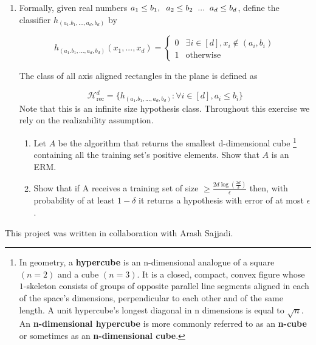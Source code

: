 \documentclass[]{book}
\theoremstyle{definition}
\begin{document}
\begin{enumerate}
    
    
    
    
    
    
    
    \item Formally, given real numbers $a_1 \leq b_1, \hspace{0.2 cm} a_2 \leq b_2 \hspace{0.2 cm} ... \hspace{0.2 cm} a_d \leq b_d $, define the classifier $h_{(a_1.b_1,...,a_d,b_d)}$ by

\begin{equation*}
  h_{(a_1.b_1,...,a_d,b_d)}(x_1,...,x_d)= \left\{\begin{matrix}
0 & \exists i \in [d] , x_i \notin (a_i,b_i)  \\ 
1 & \text{otherwise}
\end{matrix}\right. 
\end{equation*}

The class of all axis aligned rectangles in the plane is defined as

\begin{equation*}
    \mathcal{H}_{\text{rec}}^d=\{ h_{(a_1.b_1,...,a_d,b_d)}:\forall i \in [d],a_i \leq b_i\}
\end{equation*}
    Note that this is an infinite size hypothesis class. Throughout this exercise we rely
on the realizability assumption.
 
 \begin{enumerate}[I]
  \item Let $A$ be the algorithm that returns the smallest d-dimensional cube
  \footnote{In geometry, a \textbf{hypercube} is an n-dimensional analogue of a square $(n = 2)$ and a cube $(n = 3)$. It is a closed, compact, convex figure whose $1$-skeleton consists of groups of opposite parallel line segments aligned in each of the space's dimensions, perpendicular to each other and of the same length. A unit hypercube's longest diagonal in n dimensions is equal to ${ {\sqrt {n}}.}$
  An \textbf{n-dimensional hypercube} is more commonly referred to as an \textbf{n-cube} or sometimes as an \textbf{n-dimensional cube}.
  }
 containing all the training set's positive elements. Show that $A$ is an ERM.
  
  
  \item Show that if A receives a training set of size $\geq \frac{2d \log (\frac{2d}{\delta}) }{\epsilon}$ then, with probability of at least $1-\delta$ it returns a hypothesis with error of at most $\epsilon$ .
  
\end{enumerate}

\end{enumerate}

\vspace{5cm}
\begin{center}
    This project was written in collaboration with Arash Sajjadi.
\end{center}
\end{document}
